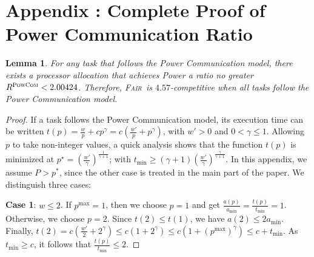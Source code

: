 \documentclass{article}
\newtheorem{lemma}{Lemma}
\newcommand\fair{\textsc{Fair}\xspace}
\newcommand\PCOM{\textsc{PowCom}\xspace}
\begin{document}
\FloatBarrier 
\newpage
\section{Appendix : Complete Proof of Power Communication Ratio}
\label{ap.powcom}
\begin{lemma}\label{lem.pcomap}
For any task that follows the Power Communication model, there exists a processor allocation that achieves Power a ratio no greater $R^{\PCOM}<2.00424$. Therefore, \fair\ is $4.57$-competitive when all tasks follow the Power Communication model.
\end{lemma}

\begin{proof}
If a task follows the Power Communication model, its execution time can be written
$t(p) = \frac{w}{p} + c p^\gamma
       = c \left( \frac{w'}{p} + p^\gamma \right)$,
with $w'>0$ and $0<\gamma \le 1$.  Allowing $p$ to take non-integer values, a quick analysis shows that
the function $t(p)$ is minimized at
$p^{\star} = \left( \frac{w'}{\gamma} \right)^{\frac{1}{\gamma+1}}$; with
 $t_{\min} \geq \left( \gamma+1\right)\left( \frac{w'}{\gamma} \right)^{\frac{\gamma}{\gamma+1}}$.
In this appendix, we assume $P>p^*$, since the other case is treated in the main part of the paper. We distinguish three cases:


\textbf{Case 1}: $w \leq 2$.  
If $p^{\max}=1$, then we choose $p=1$ and get $\frac{a(p)}{a_{\min}} = \frac{t(p)}{t_{\min}} = 1$. Otherwise, we choose $p=2$. Since $t(2) \leq t(1)$, we have $a(2) \leq 2a_{\min}$. Finally, $t(2) = c\left(\frac{w'}{2} + 2^\gamma \right) \leq c(1 + 2^\gamma) \leq c\left(1 + ({p^{\max}})^\gamma \right) \leq c +t_{\min}$. As $t_{\min} \geq c$, it follows that $\frac{t(p)}{t_{\min}} \leq 2$.


\end{proof}
\end{document}
